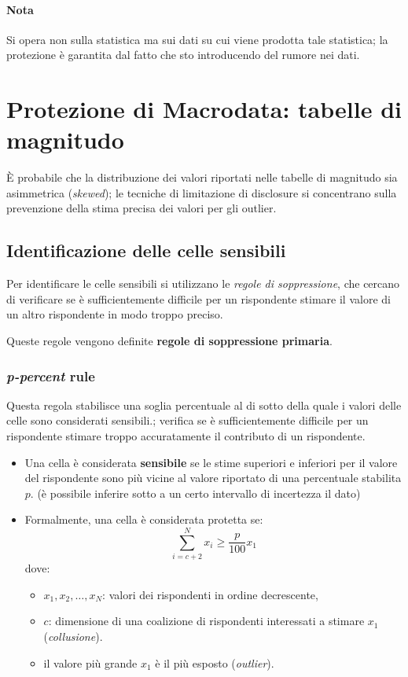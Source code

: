 \documentclass{report}
\begin{document}
\subsubsection{Nota}
Si opera non sulla statistica ma sui dati su cui viene prodotta tale statistica; la 
protezione è garantita dal fatto che sto introducendo del rumore nei dati.

\chapter{Protezione di Macrodata: tabelle di magnitudo}
È probabile che la distribuzione dei valori riportati nelle tabelle di magnitudo sia
asimmetrica (\textit{skewed}); le tecniche di limitazione di disclosure si concentrano 
sulla prevenzione della stima precisa dei valori per gli outlier.

\section{Identificazione delle celle sensibili}
Per identificare le celle sensibili si utilizzano le \textit{regole di soppressione},
che cercano di verificare
se è sufficientemente difficile per un rispondente stimare il valore di un altro 
rispondente in modo troppo preciso.

Queste regole vengono definite \textbf{regole di soppressione primaria}.

\subsection{\textit{p-percent} rule}
Questa regola stabilisce una soglia percentuale al di sotto della quale i valori 
delle celle sono considerati sensibili.; verifica se è sufficientemente difficile per 
un rispondente stimare troppo accuratamente il contributo di un rispondente.

\begin{itemize}
    \item Una cella è considerata \textbf{sensibile} se le stime superiori e inferiori per 
    il valore del rispondente sono più vicine al valore riportato di una percentuale 
    stabilita $p$. (è possibile inferire sotto a un certo intervallo di incertezza il dato)
    \item Formalmente, una cella è considerata protetta se:
    \[
    \sum_{i=c+2}^{N} x_i \geq \frac{p}{100} x_1
    \]
    dove:
    \begin{itemize}
        \item \( x_1, x_2, \ldots, x_N \): valori dei rispondenti in ordine decrescente,
        \item \( c \): dimensione di una coalizione di rispondenti interessati a stimare \( x_1 \) (\textit{collusione}).
        \item il valore più grande \( x_1 \) è il più esposto (\textit{outlier}).
    \end{itemize}
\end{itemize}
\end{document}
